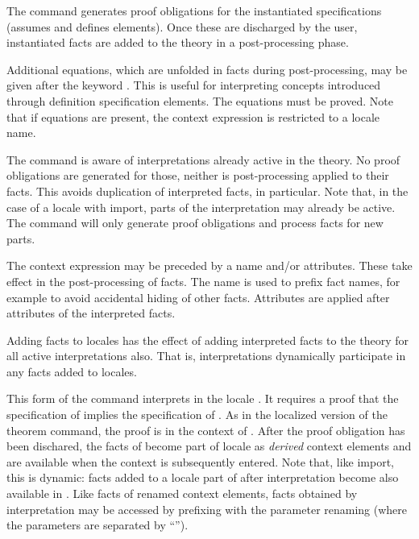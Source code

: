 \begin{isabellebody}
\begin{isamarkuptext}
\begin{descr}
  The command generates proof obligations for the instantiated
  specifications (assumes and defines elements).  Once these are
  discharged by the user, instantiated facts are added to the theory
  in a post-processing phase.

  Additional equations, which are unfolded in facts during
  post-processing, may be given after the keyword \mbox{}.
  This is useful for interpreting concepts introduced through
  definition specification elements.  The equations must be proved.
  Note that if equations are present, the context expression is
  restricted to a locale name.

  The command is aware of interpretations already active in the
  theory.  No proof obligations are generated for those, neither is
  post-processing applied to their facts.  This avoids duplication of
  interpreted facts, in particular.  Note that, in the case of a
  locale with import, parts of the interpretation may already be
  active.  The command will only generate proof obligations and
  process facts for new parts.

  The context expression may be preceded by a name and/or attributes.
  These take effect in the post-processing of facts.  The name is used
  to prefix fact names, for example to avoid accidental hiding of
  other facts.  Attributes are applied after attributes of the
  interpreted facts.

  Adding facts to locales has the effect of adding interpreted facts
  to the theory for all active interpretations also.  That is,
  interpretations dynamically participate in any facts added to
  locales.

  \item [\mbox{\isa{\isacommand{interpretation}}}~\isa{name\ {\isasymsubseteq}\ expr}]

  This form of the command interprets  in the locale
  .  It requires a proof that the specification of  implies the specification of .  As in the
  localized version of the theorem command, the proof is in the
  context of .  After the proof obligation has been
  dischared, the facts of  become part of locale  as \emph{derived} context elements and are available when the
  context  is subsequently entered.  Note that, like
  import, this is dynamic: facts added to a locale part of  after interpretation become also available in .
  Like facts of renamed context elements, facts obtained by
  interpretation may be accessed by prefixing with the parameter
  renaming (where the parameters are separated by ``\isa{{\isacharunderscore}}'').


\end{descr}
\end{isamarkuptext}
\end{isabellebody}
